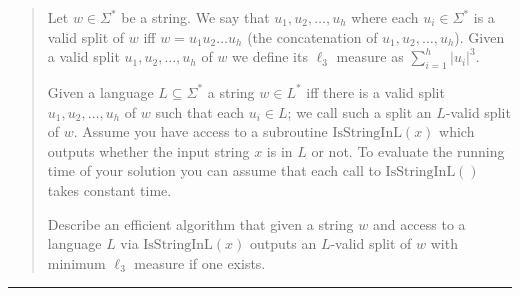 \documentclass[11pt]{article}
\newcommand{\IsSinL}{\text{IsStringInL}}
\begin{document}



\begin{quote}
	Let $w \in \Sigma^*$ be a string. We say that
  $u_1,u_2,\ldots,u_h$ where each $u_i \in \Sigma^*$ is a valid split
  of $w$ iff $w = u_1u_2\ldots u_h$ (the concatenation of
  $u_1,u_2,\ldots,u_h$). Given a valid split $u_1,u_2,\ldots,u_h$ of
  $w$ we define its $\ell_3$ measure as $\sum_{i=1}^h |u_i|^3$. 

  Given a language $L \subseteq \Sigma^*$ a string $w \in L^*$ iff
  there is a valid split $u_1,u_2,\ldots,u_h$ of $w$ such that each
  $u_i \in L$; we call such a split an $L$-valid split of $w$.  Assume
  you have access to a subroutine $\IsSinL(x)$ which outputs whether
  the input string $x$ is in $L$ or not. To evaluate the running time
  of your solution you can assume that each call to $\IsSinL()$ takes
  constant time.

  Describe an efficient algorithm that given a string $w$ and access to
  a language $L$ via $\IsSinL(x)$ outputs an $L$-valid split of $w$ 
  with minimum $\ell_3$ measure if one exists.
\end{quote}
\hrule
\end{document}
